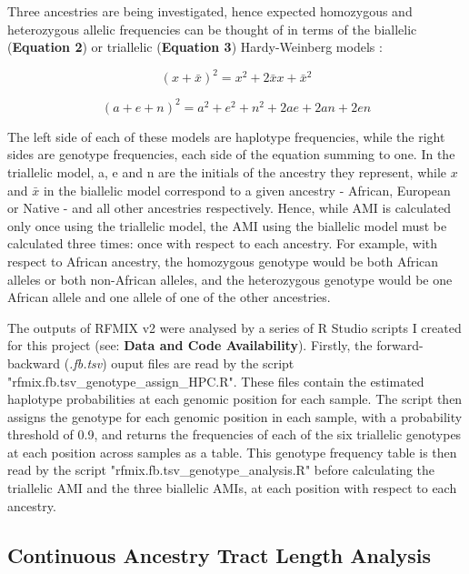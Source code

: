 \documentclass[11pt]{article}
\begin{document}
Three ancestries are being investigated, hence expected homozygous and heterozygous allelic frequencies can be thought of in terms of the biallelic (\textbf{Equation 2}) or triallelic (\textbf{Equation 3}) Hardy-Weinberg models \parencite{Norris2019}: 

\begin{equation}
    (x + \bar{x})^{2} = x^{2} + 2\bar{x}x + \bar{x}^{2}
\end{equation}


\begin{equation}
    (a + e + n)^{2} = a^{2} + e^{2} + n^{2} + 2ae + 2an + 2en
\end{equation}
\vspace{3mm}


The left side of each of these models are haplotype frequencies, while the right sides are genotype frequencies, each side of the equation summing to one. In the triallelic model, a, e and n are the initials of the ancestry they represent, while $x$ and $\bar{x}$ in the biallelic model correspond to a given ancestry - African, European or Native - and all other ancestries respectively. Hence, while AMI is calculated only once using the triallelic model, the AMI using the biallelic model must be calculated three times: once with respect to each ancestry. For example, with respect to African ancestry, the homozygous genotype would be both African alleles or both non-African alleles, and the heterozygous genotype would be one African allele and one allele of one of the other ancestries.

The outputs of RFMIX v2 were analysed by a series of R Studio scripts I created for this project (see: \textbf{Data and Code Availability}). Firstly, the forward-backward (\textit{.fb.tsv}) ouput files are read by the script "rfmix.fb.tsv\_genotype\_assign\_HPC.R". These files contain the estimated haplotype probabilities at each genomic position for each sample. The script then assigns the genotype for each genomic position in each sample, with a probability threshold of 0.9, and returns the frequencies of each of the six triallelic genotypes at each position across samples as a table. This genotype frequency table is then read by the script "rfmix.fb.tsv\_genotype\_analysis.R" before calculating the triallelic AMI and the three biallelic AMIs, at each position with respect to each ancestry.






\subsection{Continuous Ancestry Tract Length Analysis}
\end{document}
